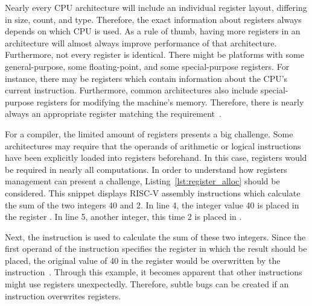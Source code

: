 Nearly every CPU architecture will include an individual register layout, differing in size, count, and type.
Therefore, the exact information about registers always depends on which CPU is used.
As a rule of thumb, having more registers in an architecture will almost always improve performance of that architecture.
Furthermore, not every register is identical.
There might be platforms with some general-purpose, some floating-point, and some special-purpose registers.
For instance, there may be registers which contain information about the CPU's current instruction.
Furthermore, common architectures also include special-purpose registers for modifying the machine's memory.
Therefore, there is nearly always an appropriate register matching the requirement~\cite[Chapter~2]{Dandamudi2005}.


For a compiler, the limited amount of registers presents a big challenge.
Some architectures may require that the operands of arithmetic or logical instructions have been explicitly loaded into registers beforehand.
In this case, registers would be required in nearly all computations.
In order to understand how registers management can present a challenge, Listing~\ref{lst:register_alloc} should be considered.
This snippet displays RISC-V assembly instructions which calculate the sum of the two integers 40 and 2.
In line 4, the integer value 40 is placed in the register .
In line 5, another integer, this time 2 is placed in .

Next, the  instruction is used to calculate the sum of these two integers.
Since the first operand of the instruction specifies the register in which the result should be placed,
the original value of 40 in the register  would be overwritten by the instruction~\cite[reference]{Patterson2017}.
Through this example, it becomes apparent that other instructions might use registers unexpectedly.
Therefore, subtle bugs can be created if an instruction overwrites registers.

